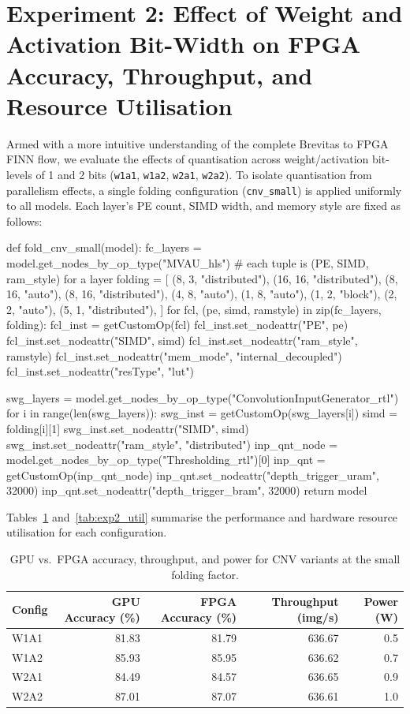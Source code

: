 \documentclass[11pt]{article}
\begin{document}
\section{Experiment 2: Effect of Weight and Activation Bit-Width on FPGA Accuracy, Throughput, and Resource Utilisation}
Armed with a more intuitive understanding of the complete Brevitas to FPGA FINN flow, we evaluate the effects of quantisation across weight/activation bit-levels of 1 and 2 bits (\texttt{w1a1}, \texttt{w1a2}, \texttt{w2a1}, \texttt{w2a2}).
To isolate quantisation from parallelism effects, a single folding configuration (\texttt{cnv\_small}) is applied uniformly to all models.
Each layer's PE count, SIMD width, and memory style are fixed as follows:
\begin{jupytercell}
def fold_cnv_small(model):
    fc_layers = model.get_nodes_by_op_type("MVAU_hls")
    # each tuple is (PE, SIMD, ram_style) for a layer
    folding = [
        (8, 3, "distributed"),
        (16, 16, "distributed"),
        (8, 16, "auto"),
        (8, 16, "distributed"),
        (4, 8, "auto"),
        (1, 8, "auto"),
        (1, 2, "block"),
        (2, 2, "auto"),
        (5, 1, "distributed"),
    ]
    for fcl, (pe, simd, ramstyle) in zip(fc_layers, folding):
        fcl_inst = getCustomOp(fcl)
        fcl_inst.set_nodeattr("PE", pe)
        fcl_inst.set_nodeattr("SIMD", simd)
        fcl_inst.set_nodeattr("ram_style", ramstyle)
        fcl_inst.set_nodeattr("mem_mode", "internal_decoupled")
        fcl_inst.set_nodeattr("resType", "lut")

    swg_layers = model.get_nodes_by_op_type("ConvolutionInputGenerator_rtl")
    for i in range(len(swg_layers)):
        swg_inst = getCustomOp(swg_layers[i])
        simd = folding[i][1]
        swg_inst.set_nodeattr("SIMD", simd)
        swg_inst.set_nodeattr("ram_style", "distributed")
    inp_qnt_node = model.get_nodes_by_op_type("Thresholding_rtl")[0]
    inp_qnt = getCustomOp(inp_qnt_node)
    inp_qnt.set_nodeattr("depth_trigger_uram", 32000)
    inp_qnt.set_nodeattr("depth_trigger_bram", 32000)
    return model
\end{jupytercell}

Tables~\ref{tab:exp2_results} and~\ref{tab:exp2_util} summarise the performance and hardware resource utilisation for each configuration.

\begin{table}[H]
\centering
\caption{GPU vs.\ FPGA accuracy, throughput, and power for CNV variants at the small folding factor.}
\label{tab:exp2_results}
\begin{tabular}{lrrrr}
\hline
\textbf{Config} & \textbf{GPU Accuracy (\%)} & \textbf{FPGA Accuracy (\%)} & \textbf{Throughput (img/s)} & \textbf{Power (W)} \\
\hline
W1A1 & 81.83 & 81.79 & 636.67 & 0.5 \\
W1A2 & 85.93 & 85.95 & 636.62 & 0.7 \\
W2A1 & 84.49 & 84.57 & 636.65 & 0.9 \\
W2A2 & 87.01 & 87.07 & 636.61 & 1.0 \\
\hline
\end{tabular}
\end{table}
\end{document}
